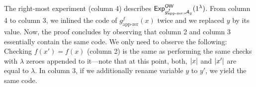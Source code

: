 \documentclass[a4paper,table,dvipsnames]{article}
\theoremstyle{definition}
\begin{document}
\begin{center}
\begin{pchstack}
{		\pcind {}\\
		}
				\pchspace
\end{pchstack}
\end{center}
The right-most experiment (column 4) describes ${\mathsf{Exp}}_{g^f_{\text{app-zer}},\mathcal{A}_g}^{\mathsf{OW}}(1^\lambda)$.
From column 4 to column 3, we inlined the code of $g^f_{\text{app-zer}}(x)$ twice and we replaced $y$ by its value. Now, the proof concludes by observing that column 2 and column 3 essentially contain the same code. We only need to observe the following: Checking $f(x')=f(x)$ (column 2) is the same as performing the same checks with $\lambda$ zeroes appended to it---note that at this point, both, $\left\lvert x\right\rvert$ and  $\left\lvert x'\right\rvert$ are equal to $\lambda$. In column 3, if we additionally rename variable $y$ to $y'$, we yield the same code.
\end{document}
